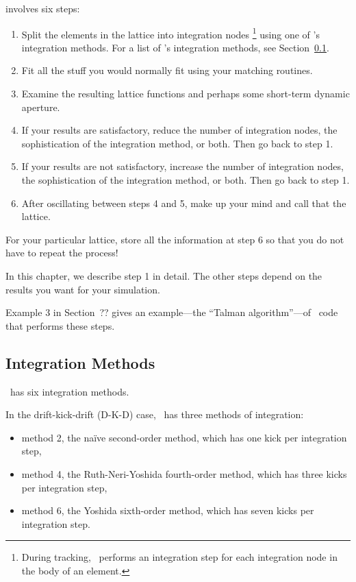 involves six steps:
\begin{enumerate}
  \item Split the elements in the lattice into integration nodes%
  \footnote{During tracking, \PTC\ performs an integration step for each
  integration node in the body of an element.}
   using one of \PTC's integration methods. For a list of \PTC's integration methods,
   see Section~\ref{sub:Integration-Methods}.
  \item Fit all the stuff you would normally fit using your matching routines.
  \item Examine the resulting lattice functions and perhaps some short-term
  dynamic aperture.
  \item If your results are satisfactory, reduce the number of integration nodes,
  the sophistication of the integration method, or both.  Then go back to step 1.
  \item If your results are not satisfactory, increase the number of integration
  nodes, the sophistication of the integration method, or both. Then go back to step 1.
  \item After oscillating between steps 4 and 5, make up your mind and
  call that the lattice.
\end{enumerate}

For your particular lattice, store all the information at step 6 so that you do
not have to repeat the process!

In this chapter, we describe step 1 in detail. The other steps depend on
the results you want for your simulation.

Example 3 in Section~??
gives an example---the ``Talman algorithm''---of \PTC\ code that performs these steps. 


\subsection{Integration Methods}
\label{sub:Integration-Methods}

%
\PTC\ has six integration methods.

%
In the drift-kick-drift (D-K-D) case, \PTC\ has three methods of integration:
\begin{itemize}
  \item method 2, the na\"{i}ve second-order method,
  which has one kick per integration step,
  \item method 4, the Ruth-Neri-Yoshida fourth-order method,
  which has three kicks per integration step,
  \item method 6, the Yoshida sixth-order method,
  which has seven kicks per integration step.
\end{itemize}

